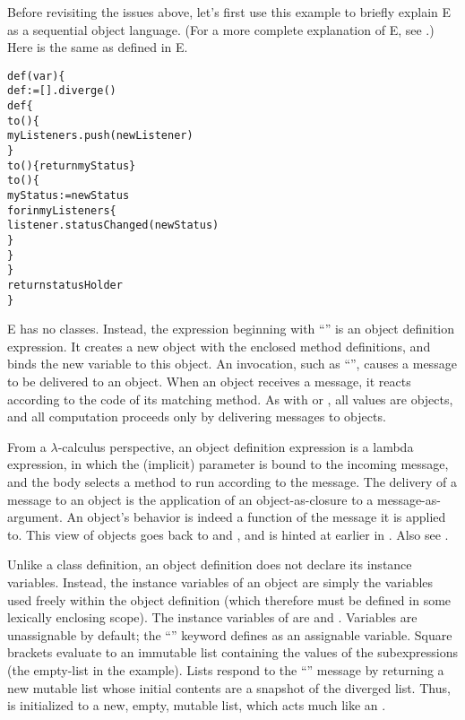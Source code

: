 \documentclass{llncs}
\begin{document}
Before revisiting the issues above, let's first use this example to
briefly explain E as a sequential object language. (For a more
complete explanation of E, see \cite{stiegler:ewalnut}.)  Here is the
same  as defined in E.
%
\begin{alltt}
    def (var ) \{
        def  := [].diverge()
        def  \{
            to () \{
                myListeners.push(newListener)
            \}
            to () \{ return myStatus \}
            to () \{
                myStatus := newStatus
                for  in myListeners \{
                    listener.statusChanged(newStatus)
                \}
            \}
        \}
        return statusHolder
    \}
\end{alltt}
%
E has no classes. Instead, the expression beginning with ``'' is an object definition expression. It creates
a new object with the enclosed method definitions, and binds the new
 variable to this object. An invocation, such as
``'', causes a message to be
delivered to an object. When an object receives a message, it reacts
according to the code of its matching method. As with 
\cite{goldberg:purplebook} or  \cite{hewitt:actors}, all
values are objects, and all computation proceeds only by delivering
messages to objects.

From a $\lambda$-calculus perspective, an object definition expression
is a lambda expression, in which the (implicit) parameter is bound to
the incoming message, and the body selects a method to run according
to the message. The delivery of a message to an object is the
application of an object-as-closure to a message-as-argument. An
object's behavior is indeed a function of the message it is applied
to. This view of objects goes back to 
\cite{goldberg:smalltalk72} and , and is hinted at earlier
in \cite{hoare65}. Also see \cite{shroff:match}.

Unlike a class definition, an object definition does not declare its
instance variables. Instead, the instance variables of an object are
simply the variables used freely within the object definition (which
therefore must be defined in some lexically enclosing scope). The
instance variables of  are  and
.  Variables are unassignable by default; the
``'' keyword defines  as an assignable
variable. Square brackets evaluate to an immutable list containing the
values of the subexpressions (the empty-list in the example). Lists
respond to the ``'' message by returning a new mutable
list whose initial contents are a snapshot of the diverged list. Thus,
 is initialized to a new, empty, mutable list, which
acts much like an .
\end{document}
